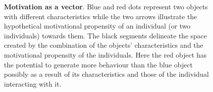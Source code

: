 \begin{figure}[h]
\begin{center}
\begin{adjustbox}{width=0.7\columnwidth}
\begin{tikzpicture}[x=0.75pt,y=0.75pt,yscale=-1,xscale=1]
            
            
            
            \end{tikzpicture}
    \end{adjustbox}
  \end{center}
\caption{\textbf{Motivation as a vector}. Blue and red dots represent two objects with different characteristics while the two arrows illustrate the hypothetical motivational propensity of an individual (or two individuals) towards them. The black segments delineate the space created by the combination of the objects' characteristics and the motivational propensity of the individuals. Here the red object has the potential to generate more behaviour than the blue object possibly as a result of its characteristics and those of the individual interacting with it.}
\label{fig: vect_mot}
\end{figure}